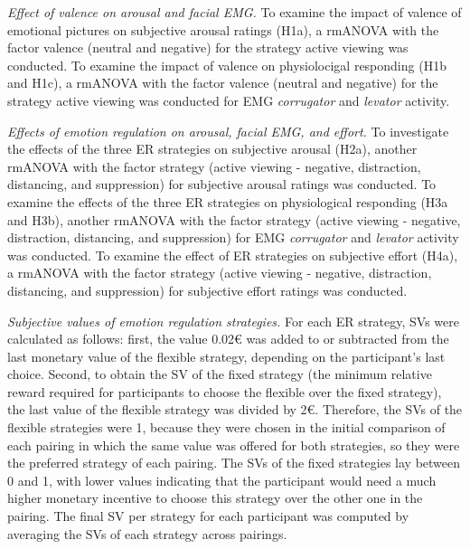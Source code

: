 \documentclass[
  man,floatsintext]{apa6}
\begin{document}
\emph{Effect of valence on arousal and facial EMG.}
To examine the impact of valence of emotional pictures on subjective arousal ratings (H1a), a rmANOVA with the factor valence (neutral and negative) for the strategy active viewing was conducted.
To examine the impact of valence on physiolocigal responding (H1b and H1c), a rmANOVA with the factor valence (neutral and negative) for the strategy active viewing was conducted for EMG \emph{corrugator} and \emph{levator} activity.

\emph{Effects of emotion regulation on arousal, facial EMG, and effort.}
To investigate the effects of the three ER strategies on subjective arousal (H2a), another rmANOVA with the factor strategy (active viewing - negative, distraction, distancing, and suppression) for subjective arousal ratings was conducted.
To examine the effects of the three ER strategies on physiological responding (H3a and H3b), another rmANOVA with the factor strategy (active viewing - negative, distraction, distancing, and suppression) for EMG \emph{corrugator} and \emph{levator} activity was conducted.
To examine the effect of ER strategies on subjective effort (H4a), a rmANOVA with the factor strategy (active viewing - negative, distraction, distancing, and suppression) for subjective effort ratings was conducted.

\emph{Subjective values of emotion regulation strategies.} For each ER strategy, SVs were calculated as follows: first, the value 0.02€ was added to or subtracted from the last monetary value of the flexible strategy, depending on the participant's last choice.
Second, to obtain the SV of the fixed strategy (the minimum relative reward required for participants to choose the flexible over the fixed strategy), the last value of the flexible strategy was divided by 2€.
Therefore, the SVs of the flexible strategies were 1, because they were chosen in the initial comparison of each pairing in which the same value was offered for both strategies, so they were the preferred strategy of each pairing.
The SVs of the fixed strategies lay between 0 and 1, with lower values indicating that the participant would need a much higher monetary incentive to choose this strategy over the other one in the pairing.
The final SV per strategy for each participant was computed by averaging the SVs of each strategy across pairings.
\end{document}
